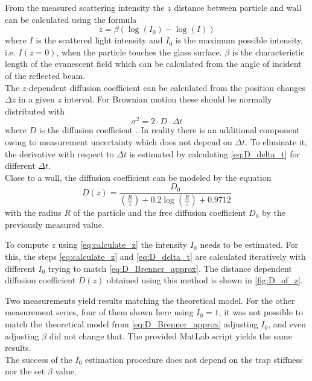 \documentclass[
    twoside=false,
    twocolumn=true,
    fontsize=11pt,
]{scrarticle}
\begin{document}
From the measured scattering intensity the $z$ distance between particle and wall can be calculated using the formula \cite{instructions}
\begin{equation}
 \label{eq:calculate_z}
 z = \beta \left(\log(I_0) - \log(I)\right)
\end{equation}
where $I$ is the scattered light intensity and $I_0$ is the maximum possible intensity, i.e. $I(z=0)$, when the particle touches the glass surface. $\beta$ is the characteristic length of the evanescent field which can be calculated from the angle of incident of the reflected beam.\\
The $z$-dependent diffusion coefficient can be calculated from the position changes $\Delta z$ in a given $z$ interval. For Brownian motion these should be normally distributed with
\begin{equation}
\label{eq:D_delta_t}
 \sigma^2 = 2 \cdot D \cdot \Delta t
\end{equation}
where $D$ is the diffusion coefficient \cite{instructions}. In reality there is an additional component owing to measurement uncertainty which does not depend on $\Delta t$. To eliminate it, the derivative with respect to $\Delta t$ is estimated by calculating \autoref{eq:D_delta_t} for different $\Delta t$.\\
Close to a wall, the diffusion coefficient can be modeled \cite{instructions} by the equation
\begin{equation}
 \label{eq:D_Brenner_approx}
 D(z) = \frac{D_0}{\left(\frac{R}{z}\right) + 0.2 \log\left(\frac{R}{z}\right) + 0.9712}
\end{equation}
with the radius $R$ of the particle and the free diffusion coefficient $D_0$ by the previously measured value.

To compute $z$ using \autoref{eq:calculate_z} the intensity $I_0$ needs to be estimated.
For this, the steps \autoref{eq:calculate_z} and \autoref{eq:D_delta_t} are calculated iteratively with different $I_0$ trying to match \autoref{eq:D_Brenner_approx}. 
The distance dependent diffusion coefficient $D(z)$ obtained using this method is shown in \autoref{fig:D_of_z}. 

Two measurements yield results matching the theoretical model.
For the other measurement series, four of them shown here using $I_0=1$, it was not possible to match the theoretical model from \autoref{eq:D_Brenner_approx} adjusting $I_0$, and even adjusting $\beta$ did not change that. 
The provided MatLab script yields the same results.\\
The success of the $I_0$ estimation procedure does not depend on the trap stiffness nor the set $\beta$ value.
\end{document}
